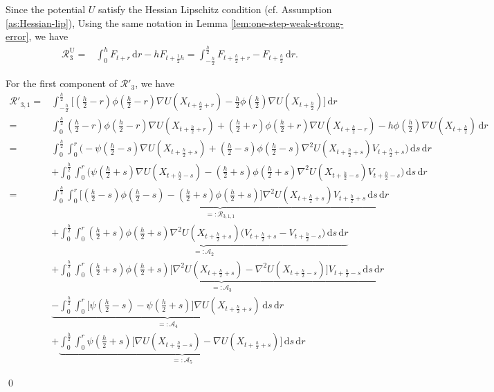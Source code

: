 \documentclass[12pt]{article}
\newenvironment{redtext}
  {\color{black}\ignorespaces}
  {\ignorespacesafterend}
\numberwithin{equation}{section}
\renewenvironment{proof}%
  {\begin{trivlist}%
   \item[]\ignorespaces}%
  {\qed\end{trivlist}}
\newcommand{\dd}{\mathrm{d}}
\begin{document}
\begin{redtext}
\begin{proof}
Since the potential $U$ satisfy the Hessian Lipschitz condition (cf. Assumption \ref{as:Hessian-lip}),
Using the same notation in Lemma \ref{lem:one-step-weak-strong-error}, we have
\begin{align}
\mathcal R^{\mathrm{U}}_3
=&
\int_0^h F_{t+r}\,\dd r
-
hF_{t+\frac{1}{2} h}
=
\int^{\frac{h}{2}}_{-\frac{h}{2}}
F_{t+\frac{h}{2}+r} - F_{t+\frac{h}{2}}
\, \dd r.
\end{align}

For the first component of $\mathcal{R}'_3$, we have
\begin{align}
\mathcal{R}'_{3,1}
=&
\int^{\frac{h}{2}}_{-\frac{h}{2}}
\Big[
(\tfrac{h}{2}-r)\phi(\tfrac{h}{2}-r)
\nabla U(X_{t+\frac{h}{2}+r})
-
\tfrac{h}{2}\phi(\tfrac{h}{2})
\nabla U(X_{t+\frac{h}{2}})
\Big]
\,\dd r
\nonumber\\
=&
\int^{\frac{h}{2}}_{0}
(\tfrac{h}{2}-r)\phi(\tfrac{h}{2}-r)
\nabla U(X_{t+\frac{h}{2}+r})
+
(\tfrac{h}{2}+r)\phi(\tfrac{h}{2}+r)
\nabla U(X_{t+\frac{h}{2}-r})
-
h
\phi(\tfrac{h}{2})
\nabla U(X_{t+\frac{h}{2}})
\,\dd r
\nonumber \\
=&
\int^{\frac{h}{2}}_0
\int^{r}_0
\Big(
-\psi(\tfrac{h}{2}-s)\nabla U (X_{t+\frac{h}{2}+s})
+
(\tfrac{h}{2}-s)\phi(\tfrac{h}{2}-s)
\nabla^2 U(X_{t+\frac{h}{2}+s})V_{t+\frac{h}{2}+s}
\Big)
\, \dd s
\, \dd r
\nonumber \\
&+
\int^{\frac{h}{2}}_0
\int^{r}_0
\Big(
\psi(\tfrac{h}{2}+s)\nabla U (X_{t+\frac{h}{2}-s})
-
(\tfrac{h}{2}+s)\phi(\tfrac{h}{2}+s)
\nabla^2 U(X_{t+\frac{h}{2}-s})V_{t+\frac{h}{2}-s}
\Big)
\, \dd s
\, \dd r
\nonumber \\
=&
\underbrace{
\int^{\frac{h}{2}}_0\int^r_0
\Big[
(\tfrac{h}{2}-s)\phi(\tfrac{h}{2}-s)
-
(\tfrac{h}{2}+s)\phi(\tfrac{h}{2}+s)
\Big]
\nabla^2U(X_{t+\frac{h}{2}+s})
V_{t+\frac{h}{2}+s}
\,\dd s\,\dd r
}_{=:\mathcal R_{3,1,1}}
\nonumber\\
&+
\underbrace{
\int^{\frac{h}{2}}_0\int^r_0
(\tfrac{h}{2}+s)\phi(\tfrac{h}{2}+s)
\nabla^2U(X_{t+\frac{h}{2}+s})
\Big(
V_{t+\frac{h}{2}+s}
-
V_{t+\frac{h}{2}-s}
\Big)
\,\dd s\,\dd r
}_{=:\mathcal A_2}
\nonumber\\
&+
\underbrace{
\int^{\frac{h}{2}}_0\int^r_0
(\tfrac{h}{2}+s)\phi(\tfrac{h}{2}+s)
\Big[
\nabla^2U(X_{t+\frac{h}{2}+s})
-
\nabla^2U(X_{t+\frac{h}{2}-s})
\Big]
V_{t+\frac{h}{2}-s}
\,\dd s\,\dd r
}_{=:\mathcal{A}_3}
\nonumber\\
&\underbrace{-
\int^{\frac{h}{2}}_0\int^r_0
\Big[
\psi(\tfrac{h}{2}-s)
-
\psi(\tfrac{h}{2}+s)
\Big]
\nabla U(X_{t+\frac{h}{2}+s})
\,\dd s\,\dd r
}_{=:\mathcal A_4}
\nonumber\\
&+
\underbrace{
\int^{\frac{h}{2}}_0\int^r_0
\psi(\tfrac{h}{2}+s)
\Big[
\nabla U(X_{t+\frac{h}{2}-s})
-
\nabla U(X_{t+\frac{h}{2}+s})
\Big]
\,\dd s\,\dd r
}_{=:\mathcal A_5 }
\label{eq:R3-mid-first-decomp}
\end{align}


\end{proof}
\end{redtext}
\end{document}
